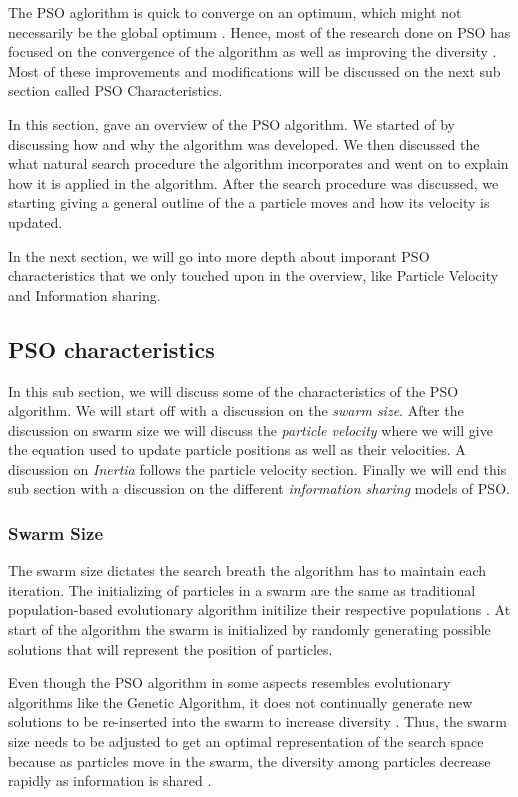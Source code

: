 The PSO aglorithm is quick to converge on an optimum, which might not necessarily be the global optimum \cite{PSOSelfHierarch}. Hence, most of the research done on PSO has focused on the convergence of the algorithm as well as improving the diversity \cite{FundamentalSwarm}. Most of these improvements and modifications will be discussed on the next sub section called PSO Characteristics.

In this section, gave an overview of the PSO algorithm. We started of by discussing how and why the algorithm was developed. We then discussed the what natural search procedure the algorithm incorporates and went on to explain how it is applied in the algorithm. After the search procedure was discussed, we starting giving a general outline of the a particle moves and how its velocity is updated. 

In the next section, we will go into more depth about imporant PSO characteristics that we only touched upon in the overview, like Particle Velocity and Information sharing.

\subsection{PSO characteristics}
In this sub section, we will discuss some of the characteristics of the PSO algorithm. We will start off with a discussion on the \emph{swarm size}. After the discussion on swarm size we will discuss the \emph{particle velocity} where we will give the equation used to update particle positions as well as their velocities. A discussion on \emph{Inertia} follows the particle velocity section. Finally we will end this sub section with a discussion on the different \emph{information sharing} models of PSO.
\subsubsection{Swarm Size}
The swarm size dictates the search breath the algorithm has to maintain each iteration. The initializing of particles in a swarm are the same as traditional population-based evolutionary algorithm initilize their respective populations \cite{FixedFAPPSO}.  At start of the algorithm the swarm is initialized by randomly generating possible solutions that will represent the position of particles. 

Even though the PSO algorithm in some aspects resembles evolutionary algorithms like the Genetic Algorithm, it does not continually generate new solutions to be re-inserted into the swarm to increase diversity \cite{PSOHybridUnitCommit}. Thus, the swarm size needs to be adjusted to get an optimal representation of the search space because as particles move in the swarm, the diversity among particles decrease rapidly as information is shared \cite{FundamentalSwarm,CompuIntelligenceIntro}. 

